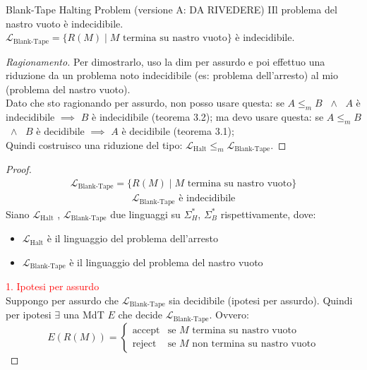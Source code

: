 \documentclass{article}  %
\theoremstyle{definition}
\newenvironment{ragionamento}[1][]
  {\begin{proof}[Ragionamento#1]\renewcommand{\qedsymbol}{}\normalfont}
  {\end{proof}}
\begin{document}
\begin{theorem}{Blank-Tape Halting Problem (versione A: DA RIVEDERE)}
IIl problema del nastro vuoto è indecidibile. \\
$\mathcal{L}_{\text{Blank-Tape}} = \{R(M) \mid M \text{ termina su nastro vuoto}\}$ è indecidibile.
\footnotesize %
  \begin{ragionamento}
  Per dimostrarlo, uso la dim per assurdo e poi effettuo una riduzione da un problema noto indecidibile (es: problema dell'arresto) al mio (problema del nastro vuoto). \\
  Dato che sto ragionando per assurdo, non posso usare questa: se $A \leq_m B$ $\;\wedge\;$ $A$ è indecidibile $\implies$ $B$ è indecidibile (teorema 3.2); ma devo usare 
  questa: se $A \leq_m B$ $\;\wedge\;$ $B$ è decidibile $\implies$ $A$ è decidibile (teorema 3.1); \\
  Quindi costruisco una riduzione del tipo: $\mathcal{L}_{\text{Halt}} \leq_m \mathcal{L}_{\text{Blank-Tape}}$.
  \end{ragionamento}
  \begin{proof}
    \begin{align*}
      \mathcal{L}_{\text{Blank-Tape}} = \{R(M) \mid M \text{ termina su nastro vuoto}\} \tag*{(ipotesi)}
    \end{align*}
    \begin{align*}
      \mathcal{L}_{\text{Blank-Tape}} \text{ è indecidibile} \tag*{(tesi)}
    \end{align*}
    Siano $\mathcal{L}_{\text{Halt}}$ , $\mathcal{L}_{\text{Blank-Tape}}$ due linguaggi su $\Sigma_H^*$, $\Sigma_B^*$ rispettivamente, dove:
    \begin{itemize}
      \item $\mathcal{L}_{\text{Halt}}$ è il linguaggio del problema dell'arresto
      \item $\mathcal{L}_{\text{Blank-Tape}}$ è il linguaggio del problema del nastro vuoto
    \end{itemize}
    \textcolor{red}{1. Ipotesi per assurdo} \\
    Suppongo per assurdo che $\mathcal{L}_{\text{Blank-Tape}}$ sia decidibile (ipotesi per assurdo). Quindi per ipotesi $\exists$ una MdT $E$ 
    che decide $\mathcal{L}_{\text{Blank-Tape}}$. Ovvero:
    \[
    E(R(M)) =
    \begin{cases}
      \text{accept} & \text{se } M \text{ termina su nastro vuoto} \\
      \text{reject} & \text{se } M \text{  non termina su nastro vuoto}

\end{cases}\]
\end{proof}
\end{theorem}
\end{document}
